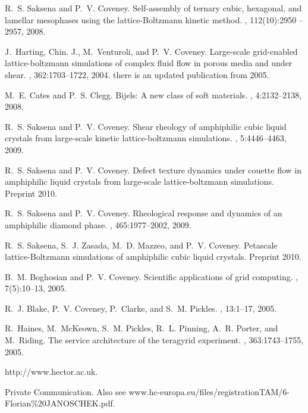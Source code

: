 \begin{thebibliography}{10}
R.~S. Saksena and P.~V. Coveney.
\newblock Self-assembly of ternary cubic, hexagonal, and lamellar mesophases
  using the lattice-{B}oltzmann kinetic method.
, 112(10):2950 -- 2957, 2008.

J.~Harting, Chin. J., M.~Venturoli, and P.~V. Coveney.
\newblock Large-scale grid-enabled lattice-boltzmann simulations of complex
  fluid flow in porous media and under shear.
, 362:1703--1722, 2004.
\newblock there is an updated publication from 2005.

M.~E. Cates and P.~S. Clegg.
\newblock Bijels: {A} new class of soft materials.
, 4:2132--2138, 2008.

R.~S. Saksena and P.~V. Coveney.
\newblock Shear rheology of amphiphilic cubic liquid crystals from large-scale
  kinetic lattice-boltzmann simulations.
, 5:4446--4463, 2009.

R.~S. Saksena and P.~V. Coveney.
\newblock Defect texture dynamics under couette flow in amphiphilic liquid
  crystals from large-scale lattice-boltzmann simulations. {Preprint} 2010.

R.~S. Saksena and P.~V. Coveney.
\newblock Rheological response and dynamics of an amphiphilic diamond phase.
, 465:1977--2002, 2009.

R.~S. Saksena, S.~J. Zasada, M.~D. Mazzeo, and P.~V. Coveney.
\newblock Petascale lattice-{B}oltzmann simulations of amphiphilic cubic liquid
  crystals. {Preprint 2010.}

B.~M. Boghosian and P.~V. Coveney.
\newblock Scientific applications of grid computing.
, 7(5):10--13, 2005.

R.~J. Blake, P.~V. Coveney, P.~Clarke, and S.~M. Pickles.
, 13:1--17, 2005.

R.~Haines, M.~McKeown, S.~M. Pickles, R.~L. Pinning, A.~R. Porter, and
  M.~Riding.
\newblock The service architecture of the teragyrid experiment.
, 363:1743--1755, 2005.

{h}ttp://www.hector.ac.uk.

Private Communication. {Also see
  {www.hc-europa.eu/files/registrationTAM/6-Florian\%20JANOSCHEK.pdf}}.


\end{thebibliography}
